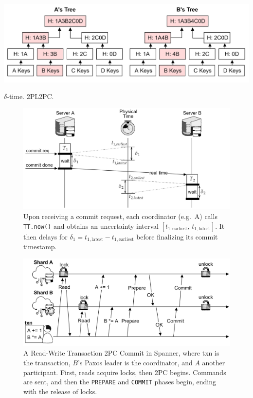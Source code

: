 \begin{multicols}{2}
\hspace{-1.5em}
\includegraphics[width=\linewidth]{Sections/dyn/merkle.png}\\
\end{multicols}

\newpage

\noindent
$\delta$-time. 2PL2PC.



\begin{figure}[ht!]

    \centering
    \includegraphics[width=\textwidth]{Sections/span/tt_2.png}
    \caption{Upon receiving a commit request, each coordinator (e.g.\ A) calls \texttt{TT.now()} and obtains an uncertainty interval \([t_{1,\mathrm{earliest}},\,t_{1,\mathrm{latest}}]\). It then delays for \(\delta_1 = t_{1,\mathrm{latest}} - t_{1,\mathrm{earliest}}\) before finalizing its commit timestamp.}
\end{figure}


\begin{figure}[ht!]
    \centering
    \includegraphics[width=\textwidth]{Sections/span/rw.png}
    \caption{A Read-Write Transaction 2PC Commit in Spanner, where txn is the transaction, $B$'s Paxos leader is the coordinator, and $A$ another participant. First, reads acquire locks, then 2PC begins.
    Commands are sent, and then the \texttt{PREPARE} and \texttt{COMMIT} phases begin, ending with the release of locks.}

\end{figure}

